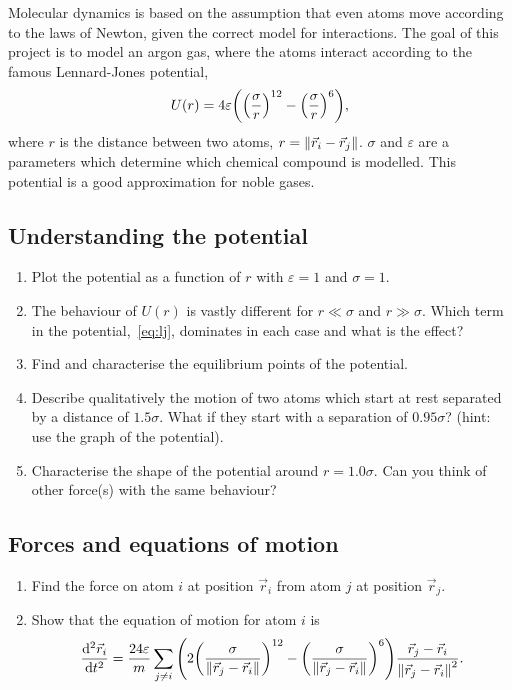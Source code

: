 \documentclass[11pt,british,a4paper]{report}
\begin{document}
Molecular dynamics is based on the assumption that even atoms move according to the laws of Newton, given the correct model for interactions. The goal of this project is to model an argon gas, where the atoms interact according to the famous Lennard-Jones potential,
\begin{equation}
    U(r) = 4\varepsilon\qty(\qty(\frac{\sigma}{r})^{12} - \qty(\frac{\sigma}{r})^6), \label{eq:lj}
\end{equation}
where \(r\) is the distance between two atoms, \(r=\norm{\vec{r}_i-\vec{r}_j}\). \(\sigma\) and \(\varepsilon\) are a parameters which determine which chemical compound is modelled. This potential is a good approximation for noble gases.

\subsection{Understanding the potential}\label{subsec:understanding}
\begin{enumerate}[label=\roman*.]
    \item Plot the potential as a function of \(r\) with \(\varepsilon=1\) and \(\sigma=1\).
    \item The behaviour of \(U(r)\) is vastly different for \(r \ll \sigma\) and \(r \gg \sigma\). Which term in the potential,~\vref{eq:lj}, dominates in each case and what is the effect?
    \item Find and characterise the equilibrium points of the potential.
    \item Describe qualitatively the motion of two atoms which start at rest separated by a distance of \(\num{1.5}\sigma\). What if they start with a separation of \(\num{0.95}\sigma\)?  (hint: use the graph of the potential).
    \item Characterise the shape of the potential around \(r=\num{1.0}\sigma\). Can you think of other force(s) with the same behaviour?
\end{enumerate}

\subsection{Forces and equations of motion}
\begin{enumerate}[label=\roman*.]
    \item Find the force on atom \(i\) at position \(\vec{r}_i\) from atom \(j\) at position \(\vec{r}_j\).
    \item Show that the equation of motion for atom \(i\) is
    \begin{equation}
        \dv[2]{\vec{r}_i}{t} = \frac{24\varepsilon}{m} \sum_{j \neq i} \qty(2\qty(\frac{\sigma}{\norm{\vec{r}_j-\vec{r}_i}})^{12}-\qty(\frac{\sigma}{\norm{\vec{r}_j-\vec{r}_i}})^6)\frac{\vec{r}_j-\vec{r}_i}{\norm{\vec{r}_j-\vec{r}_i}^2}.
    \end{equation}
\end{enumerate}
\end{document}
